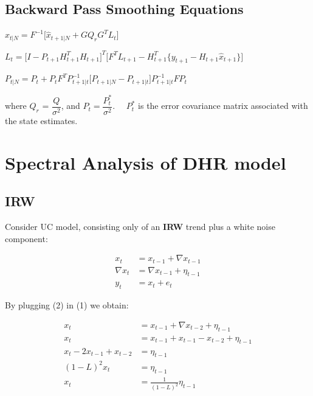 \documentclass{article}\usepackage[]{graphicx}\usepackage[]{color}
\begin{document}
\subsection*{Backward Pass Smoothing Equations}

$\hat{x}_{t | N} = F^{-1} \Big[ \hat{x}_{t+1 | N} + G Q_r G^T L_t \Big]$

$L_t = \Big[ I - P_{t+1} H_{t+1}^T H_{t+1} \Big]^{T} \Big[ F^T L_{t+1} - H_{t+1}^T \{y_{t+1} - H_{t+1}\hat{x}_{t+1} \} \Big]  $

$P_{t|N} = P_t + P_t F^T P_{t+1|t}^{-1} \Big[ P_{t+1|N} - P_{t+1 | t} \Big] P_{t+1 | t}^{-1} F P_t $

\vspace{0.2cm}
where $Q_r$ = $\dfrac{Q}{\sigma^2}$, and $P_t = \dfrac{P_t^{*}}{\sigma^2}. \quad $ $P_t^{*}$ is the error covariance matrix associated with the state estimates.





\newpage

\section*{Spectral Analysis of DHR model}

\subsection*{IRW}

Consider UC model, consisting only of an \textbf{IRW} trend plus a white noise component: 


\begin{align} \label{eqIRW}
x_t &=  x_{t-1} +  \nabla x_{t-1}  \\ 
\nabla x_{t} &= \nabla x_{t-1} + \eta_{t-1} \\
y_t &= x_t + {e_t}
\end{align}

By plugging (2) in (1) we obtain:

\begin{equation*}
\begin{split}
x_t &= x_{t-1} + \nabla x_{t-2} + \eta_{t-1} \\
x_t   & =   x_{t-1} + x_{t-1} - x_{t-2} + \eta_{t-1} \\
x_t - 2 x_{t-1} + x_{t-2} &= \eta_{t-1} \\
(1 - L)^2 x_t &= \eta_{t-1} \\
x_t &= \frac{1}{(1 - L)^2} \eta_{t-1}
\end{split}
\end{equation*}
\end{document}

